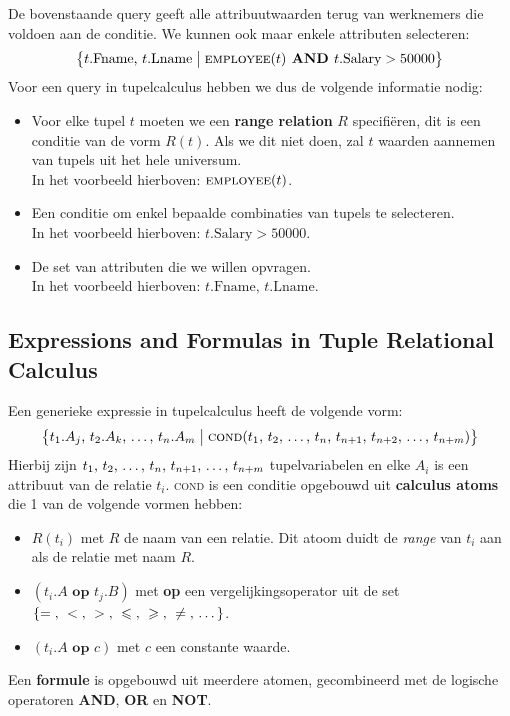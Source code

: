 De bovenstaande query geeft alle attribuutwaarden terug van werknemers die voldoen aan de conditie. We kunnen ook maar enkele attributen selecteren:
\vspace{-2mm}
\[ \big\{ t.\text{Fname, } t.\text{Lname} \bigm| \textsc{employee}(t) \textbf{ AND } t.\text{Salary} > 50000 \big\} \]
Voor een query in tupelcalculus hebben we dus de volgende informatie nodig:
\begin{itemize}
\item Voor elke tupel $t$ moeten we een \textbf{range relation} $R$ specifi\"eren, dit is een conditie van de vorm $R(t)$. Als we dit niet doen, zal $t$ waarden aannemen van tupels uit het hele universum.\\
In het voorbeeld hierboven: $\textsc{employee}(t)$.
\item Een conditie om enkel bepaalde combinaties van tupels te selecteren.\\
In het voorbeeld hierboven: $t.\text{Salary} > 50000$.
\item De set van attributen die we willen opvragen.\\
In het voorbeeld hierboven: $t.\text{Fname, } t.\text{Lname}$.
\end{itemize}


\subsection{Expressions and Formulas in Tuple Relational Calculus}
Een generieke expressie in tupelcalculus heeft de volgende vorm:
\vspace{-2mm}
\[ \big\{ t_1.A_j \text{, } t_2.A_k \text{, \dots, } t_n.A_m \bigm| \textsc{cond} ( t_1 \text{, } t_2 \text{, \dots, } t_n \text{, } t_{n+1} \text{, } t_{n+2} \text{, \dots, } t_{n+m} ) \big\} \]
Hierbij zijn $t_1 \text{, } t_2 \text{, \dots, } t_n \text{, } t_{n+1} \text{, \dots, } t_{n+m}$ tupelvariabelen en elke $A_i$ is een attribuut van de relatie $t_i$. \textsc{cond} is een conditie opgebouwd uit \textbf{calculus atoms} die 1 van de volgende vormen hebben:
\begin{itemize}
\item $R(t_i)$ met $R$ de naam van een relatie. Dit atoom duidt de \textit{range} van $t_i$ aan als de relatie met naam $R$.
\item $(t_i.A \textbf{ op } t_j.B)$ met \textbf{op} een vergelijkingsoperator uit de set $\{=  \text{, } < \text{, } > \text{, } \leqslant \text{, } \geqslant \text{, } \neq \text{, \dots} \}$.
\item $(t_i.A \textbf{ op } c)$ met $c$ een constante waarde.
\end{itemize}
Een \textbf{formule} is opgebouwd uit meerdere atomen, gecombineerd met de logische operatoren \textbf{AND}, \textbf{OR} en \textbf{NOT}.


